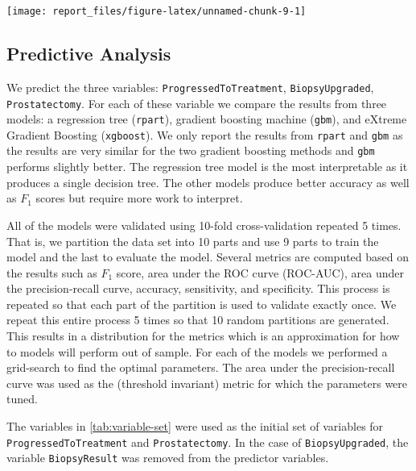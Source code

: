 \documentclass[]{article}
\begin{document}
\begin{center}\texttt{[image: report\_files/figure-latex/unnamed-chunk-9-1]} \end{center}

\hypertarget{predictive-analysis}{%
\subsection{Predictive Analysis}\label{predictive-analysis}}

We predict the three variables: \texttt{ProgressedToTreatment}, \texttt{BiopsyUpgraded}, \texttt{Prostatectomy}.
For each of these variable we compare the results from three models: a regression tree (\texttt{rpart}), gradient boosting machine (\texttt{gbm}), and eXtreme Gradient Boosting (\texttt{xgboost}).
We only report the results from \texttt{rpart} and \texttt{gbm} as the results are very similar for the two gradient boosting methods and \texttt{gbm} performs slightly better.
The regression tree model is the most interpretable as it produces a single decision tree.
The other models produce better accuracy as well as \(F_1\) scores but require more work to interpret.

All of the models were validated using 10-fold cross-validation repeated 5 times.
That is, we partition the data set into 10 parts and use 9 parts to train the model and the last to evaluate the model.
Several metrics are computed based on the results such as \(F_1\) score, area under the ROC curve (ROC-AUC), area under the precision-recall curve, accuracy, sensitivity, and specificity.
This process is repeated so that each part of the partition is used to validate exactly once.
We repeat this entire process 5 times so that 10 random partitions are generated.
This results in a distribution for the metrics which is an approximation for how to models will perform out of sample.
For each of the models we performed a grid-search to find the optimal parameters.
The area under the precision-recall curve was used as the (threshold invariant) metric for which the parameters were tuned.

The variables in \ref{tab:variable-set} were used as the initial set of variables for \texttt{ProgressedToTreatment} and \texttt{Prostatectomy}. In the case of \texttt{BiopsyUpgraded}, the variable \texttt{BiopsyResult} was removed from the predictor variables.
\end{document}
